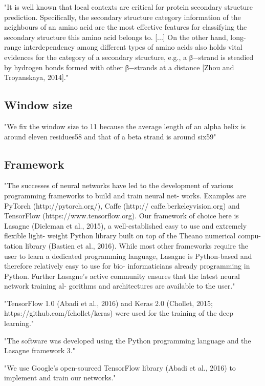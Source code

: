 "It is well known that local contexts are critical for protein secondary structure prediction. Specifically, the secondary structure category information of the neighbours of an amino acid are the most effective features for classifying the secondary structure this amino acid belongs to. [...] On the other hand, long-range interdependency among different types of amino acids also holds vital evidences for the category of a secondary structure, e.g., a β−strand is steadied by hydrogen bonds formed with other β−strands at a distance [Zhou and Troyanskaya, 2014]." \cite{Li2016}

\subsection{Window size}
"We fix the window size to 11 because the average length of an alpha helix is around eleven residues58 and that of a beta strand is around six59" \cite{Wang2016}

\subsection{Framework}
"The successes of neural networks have led to the development of various programming frameworks to build and train neural net- works. Examples are PyTorch (http://pytorch.org/), Caffe (http:// caffe.berkeleyvision.org) and TensorFlow (https://www.tensorflow.org). Our framework of choice here is Lasagne (Dieleman et al., 2015), a well-established easy to use and extremely flexible light- weight Python library built on top of the Theano numerical compu- tation library (Bastien et al., 2016). While most other frameworks require the user to learn a dedicated programming language, Lasagne is Python-based and therefore relatively easy to use for bio- informaticians already programming in Python. Further Lasagne’s active community ensures that the latest neural network training al- gorithms and architectures are available to the user." \cite{Jurtz2017}

"TensorFlow 1.0 (Abadi et al., 2016) and Keras 2.0 (Chollet, 2015; https://github.com/fchollet/keras) were used for the training of the deep learning." \cite{Fang2017}

"The software was developed using the Python programming language and the Lasagne framework 3." \cite{Hattori2017}

"We use Google’s open-sourced TensorFlow library (Abadi et al., 2016) to implement and train our networks." \cite{Heffernan2017}

